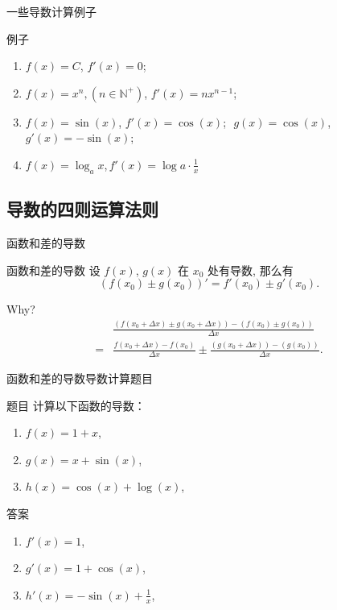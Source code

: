 \documentclass[
10pt,
aspectratio=43,
]{beamer}
\begin{document}
\begin{frame}{一些导数计算例子}
	\begin{block}{例子}
		\begin{enumerate}
			\item $f(x)=C$, \pause $f'(x) =0$;\pause
			\item $f(x)=x^n, (n\in\mathbb{N}^+)$, \pause $f'(x) = n x^{n-1}$;\pause
			\item $f(x)=\sin(x)$, \pause $f'(x)=\cos(x)$; \,\,\pause $g(x)=\cos(x)$, \pause $g'(x)=-\sin(x)$;\pause
			\item $f(x)=\log_a  x$,\,\pause $f'(x)=\log a \cdot \displaystyle\frac{1}{x}$
		\end{enumerate}
	\end{block}
\end{frame}

\subsection{导数的四则运算法则}
\begin{frame}{函数和差的导数}
	\begin{block}{函数和差的导数}
		设 $f(x)$, $g(x)$ 在 $x_0$ 处有导数, 那么有
		\[
			(f(x_0)\pm g(x_0))' = f'(x_0)\pm g'(x_0).
		\]
	\end{block}
	\pause
	Why?
	\pause
	\begin{align*}
		  & \frac{(f(x_0+\Delta x)\pm g(x_0+\Delta x))-(f(x_0)\pm g(x_0))}{\Delta x}                  \\
		= & \frac{f(x_0+\Delta x)-f(x_0)}{\Delta x}\pm \frac{( g(x_0+\Delta x))-( g(x_0))}{\Delta x}.
	\end{align*}
\end{frame}

\begin{frame}{函数和差的导数}{导数计算题目}
	\begin{block}{题目}
		计算以下函数的导数：
		\begin{enumerate}
			\item $f(x) = 1 + x$,
			\item $g(x) = x + \sin(x)$,
			\item $h(x) = \cos(x) + \log(x)$,
		\end{enumerate}
	\end{block}

	\pause

	\begin{block}{答案}
		\begin{enumerate}
			\item $f'(x) = 1$,
			\item $g'(x) = 1 + \cos(x)$,
			\item $h'(x) = -\sin(x) + \displaystyle\frac{1}{x}$,
		\end{enumerate}
	\end{block}
\end{frame}
\end{document}
